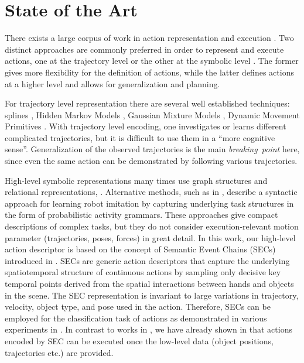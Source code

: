  
  

\clearpage  %
\section{State of the Art}
\label{sec:soa}

There exists a large corpus of work in action representation and execution \cite{Ijspeert2002,Ude93,Lee2006,Calinon2007}. Two distinct approaches are commonly preferred in order to represent and execute actions, one at the trajectory level \cite{Ijspeert2002} or the other at the symbolic level \cite{Dillmann2010}.
The former gives more flexibility for the definition of actions, while the latter defines actions at a higher level and allows for generalization and planning.

For trajectory level representation there are several well established techniques: splines \cite{Ude93}, Hidden Markov Models \cite{Lee2006}, Gaussian Mixture Models \cite{Calinon2007}, Dynamic Movement Primitives  \cite{Ijspeert2002,Luksch12}.
With trajectory level encoding, one investigates or learns different complicated trajectories, but it is difficult to use them in a ``more cognitive sense''. Generalization of the observed trajectories is the main {\it breaking~point} here, since even the same action can be demonstrated by following various trajectories.

High-level symbolic representations many times use graph structures and relational representations,
\eg \cite{Pardowitz2007,Ekvall2006,Aksoy2011}. Alternative methods, such as in \cite{Lee2013}, describe a syntactic approach for learning robot imitation by capturing  underlying task structures in the form of probabilistic activity grammars. 
These approaches give compact descriptions of complex tasks,
but they do not consider execution-relevant motion parameter (trajectories, poses, forces) in great detail.
In this work, our high-level action descriptor is based on the concept of Semantic Event Chains (SECs) introduced in  \cite{Aksoy2011}. 
SECs are generic action descriptors that capture the underlying spatiotemporal structure of continuous actions by sampling only
decisive key temporal points derived from the spatial interactions between hands and objects in the scene. The
SEC representation is invariant to large variations in trajectory, velocity, object type, and pose used in the action. 
Therefore, SECs can be employed for the classification task of actions as demonstrated in various experiments in  \cite{Aksoy2010,Aksoy2011,Aksoy2011b,Aksoy2013,AksoyRAS2014}. 
In contrast to works in  \cite{Pardowitz2007,Ekvall2006}, we have already shown in \cite{Aksoy2011b} that actions encoded by SEC can be executed once the low-level data (object positions, trajectories etc.) are provided. 


